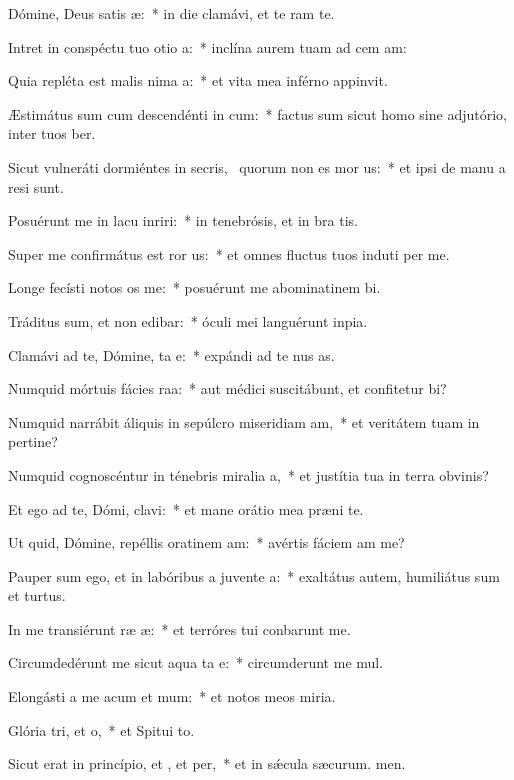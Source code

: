 \item Dómine, Deus satis æ:~* in die clamávi, et te ram te.
\item Intret in conspéctu tuo otio a:~* inclína aurem tuam ad cem am:
\item Quia repléta est malis nima a:~* et vita mea inférno appinvit.
\item Æstimátus sum cum descendénti in cum:~* factus sum sicut homo sine adjutório, inter tuos ber.
\item Sicut vulneráti dormiéntes in secris,~\pscross{} quorum non es mor us:~* et ipsi de manu a resi sunt.
\item Posuérunt me in lacu inriri:~* in tenebrósis, et in bra tis.
\item Super me confirmátus est ror us:~* et omnes fluctus tuos induti per me.
\item Longe fecísti notos os  me:~* posuérunt me abominatinem bi.
\item Tráditus sum, et non edibar:~* óculi mei languérunt  inpia.
\item Clamávi ad te, Dómine, ta e:~* expándi ad te nus as.
\item Numquid mórtuis fácies raa:~* aut médici suscitábunt, et confitetur bi?
\item Numquid narrábit áliquis in sepúlcro miseridiam am,~* et veritátem tuam in pertine?
\item Numquid cognoscéntur in ténebris miralia a,~* et justítia tua in terra obvinis?
\item Et ego ad te, Dómi, clavi:~* et mane orátio mea præni te.
\item Ut quid, Dómine, repéllis oratinem am:~* avértis fáciem am  me?
\item Pauper sum ego, et in labóribus a juvente a:~* exaltátus autem, humiliátus sum et turtus.
\item In me transiérunt ræ æ:~* et terróres tui conbarunt me.
\item Circumdedérunt me sicut aqua ta e:~* circumderunt me mul.
\item Elongásti a me acum et mum:~* et notos meos  miria.
\item Glória tri, et o,~* et Spitui to.
\item Sicut erat in princípio, et , et per,~* et in sǽcula sæcurum. men.
